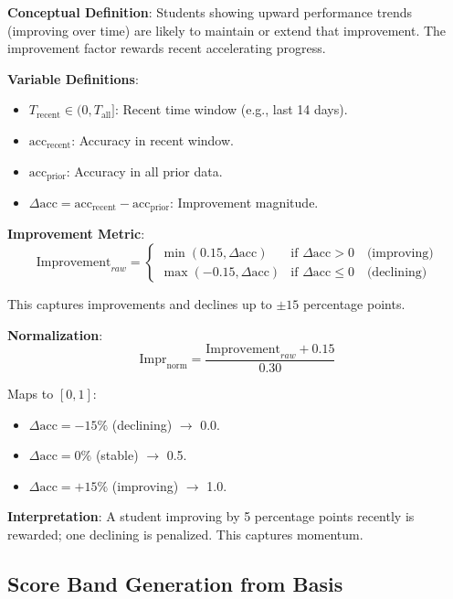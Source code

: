 \documentclass[sigconf,authordraft,twoside]{acmart}
\begin{document}
\textbf{Conceptual Definition}:
Students showing upward performance trends (improving over time) are likely to maintain or extend that improvement. The improvement factor rewards recent accelerating progress.

\textbf{Variable Definitions}:
\begin{itemize}
\item $T_{\text{recent}} \in (0, T_{\text{all}}]$: Recent time window (e.g., last 14 days).
\item $\text{acc}_{\text{recent}}$: Accuracy in recent window.
\item $\text{acc}_{\text{prior}}$: Accuracy in all prior data.
\item $\Delta \text{acc} = \text{acc}_{\text{recent}} - \text{acc}_{\text{prior}}$: Improvement magnitude.
\end{itemize}

\textbf{Improvement Metric}:
\begin{equation}
\text{Improvement}_{raw} = \begin{cases}
\min(0.15, \Delta \text{acc}) & \text{if } \Delta \text{acc} > 0 \quad \text{(improving)} \\
\max(-0.15, \Delta \text{acc}) & \text{if } \Delta \text{acc} \leq 0 \quad \text{(declining)}
\end{cases}
\end{equation}

This captures improvements and declines up to $\pm 15$ percentage points.

\textbf{Normalization}:
\begin{equation}
\text{Impr}_{\text{norm}} = \frac{\text{Improvement}_{raw} + 0.15}{0.30}
\end{equation}

Maps to $[0, 1]$:
\begin{itemize}
\item $\Delta \text{acc} = -15\%$ (declining) $\to$ 0.0.
\item $\Delta \text{acc} = 0\%$ (stable) $\to$ 0.5.
\item $\Delta \text{acc} = +15\%$ (improving) $\to$ 1.0.
\end{itemize}

\textbf{Interpretation}:
A student improving by 5 percentage points recently is rewarded; one declining is penalized. This captures momentum.

\subsection{Score Band Generation from Basis}
\end{document}
